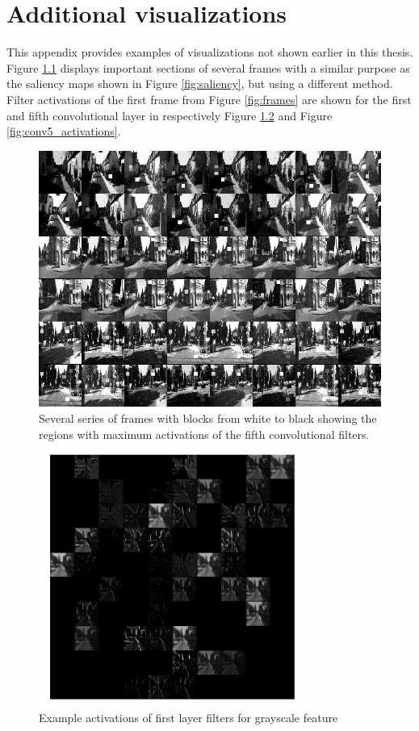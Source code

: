 \chapter{Additional visualizations}
\label{app:additional_visualizations}
This appendix provides examples of visualizations not shown earlier in this thesis. Figure \ref{fig:activate_regions} displays important sections of several frames with a similar purpose as the saliency maps shown in Figure \ref{fig:saliency}, but using a different method. Filter activations of the first frame from Figure \ref{fig:frames} are shown for the first and fifth convolutional layer in respectively Figure \ref{fig:conv1_activations} and Figure \ref{fig:conv5_activations}. 

\begin{figure}[b!]
\centering
\includegraphics[width=\textwidth]{images/activated_regions.png}
\caption{Several series of frames with blocks from white to black showing the regions with maximum activations of the fifth convolutional filters.}
\label{fig:activate_regions}
\end{figure}

\begin{figure}
\centering
\includegraphics[width=0.75\textwidth]{images/conv1_activations_image1.png}
\caption{Example activations of first layer filters for grayscale feature}
\label{fig:conv1_activations}
\end{figure}


